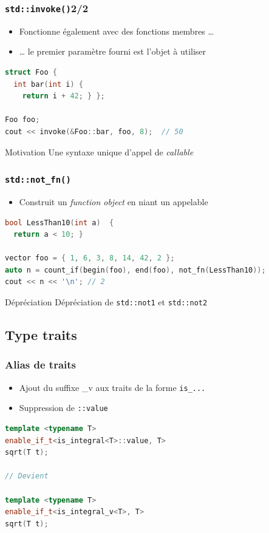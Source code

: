 \documentclass[C++.tex]{subfiles}
\begin{document}
\begin{frame}[fragile]
	\frametitle{\lstinline|std::invoke()|\titlehfill{}2/2}
	\begin{itemize}
		\item Fonctionne également avec des fonctions membres \ldots
		\item \ldots{} le premier paramètre fourni est l'objet à utiliser
	\end{itemize}

	\begin{lstlisting}[language=C++]
struct Foo {
  int bar(int i) {
    return i + 42; } };

Foo foo;
cout << invoke(&Foo::bar, foo, 8);  // 50\end{lstlisting}

	\begin{block}{Motivation}
		Une syntaxe unique d'appel de \textit{callable}
	\end{block}
\end{frame}

\begin{frame}[fragile]
	\frametitle{\lstinline|std::not_fn()|}
	\begin{itemize}
		\item Construit un \textit{function object} en niant un appelable
	\end{itemize}

	\begin{lstlisting}[language=C++]
bool LessThan10(int a) 	{
  return a < 10; }
	
vector foo = { 1, 6, 3, 8, 14, 42, 2 };
auto n = count_if(begin(foo), end(foo), not_fn(LessThan10)); 
cout << n << '\n'; // 2\end{lstlisting}

	\begin{block}{Dépréciation}
		Dépréciation de \lstinline|std::not1| et \lstinline|std::not2|
	\end{block}
\end{frame}

\subsection*{Type traits}
\begin{frame}[fragile]
	\frametitle{Alias de traits}
	\begin{itemize}
		\item Ajout du suffixe \_v aux traits de la forme \lstinline|is_...|
		\item Suppression de \lstinline|::value|
	\end{itemize}

	\begin{lstlisting}[language=C++]
template <typename T>
enable_if_t<is_integral<T>::value, T>
sqrt(T t);

// Devient 

template <typename T>
enable_if_t<is_integral_v<T>, T>
sqrt(T t);\end{lstlisting}
\end{frame}
\end{document}
